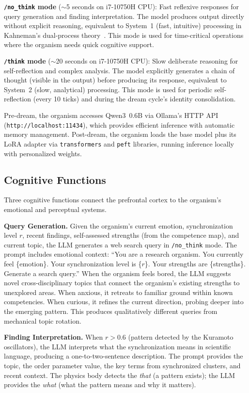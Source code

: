 \documentclass[11pt,a4paper,twocolumn]{article}
\begin{document}
\textbf{\texttt{/no\_think} mode} ($\sim$5 seconds on i7-10750H CPU): Fast reflexive responses for query generation and finding interpretation.
The model produces output directly without explicit reasoning, equivalent to System~1 (fast, intuitive) processing in Kahneman's dual-process theory~\cite{kahneman2011}.
This mode is used for time-critical operations where the organism needs quick cognitive support.

\textbf{\texttt{/think} mode} ($\sim$20 seconds on i7-10750H CPU): Slow deliberate reasoning for self-reflection and complex analysis.
The model explicitly generates a chain of thought (visible in the output) before producing its response, equivalent to System~2 (slow, analytical) processing.
This mode is used for periodic self-reflection (every 10 ticks) and during the dream cycle's identity consolidation.

Pre-dream, the organism accesses Qwen3~0.6B via Ollama's HTTP API (\texttt{http://localhost:11434}), which provides efficient inference with automatic memory management.
Post-dream, the organism loads the base model plus its LoRA adapter via \texttt{transformers} and \texttt{peft} libraries, running inference locally with personalized weights.

\subsection{Cognitive Functions}

Three cognitive functions connect the prefrontal cortex to the organism's emotional and perceptual systems.

\textbf{Query Generation.}
Given the organism's current emotion, synchronization level $r$, recent findings, self-assessed strengths (from the competence map), and current topic, the LLM generates a web search query in \texttt{/no\_think} mode.
The prompt includes emotional context: ``You are a research organism.
You currently feel \{emotion\}.
Your synchronization level is \{$r$\}.
Your strengths are \{strengths\}.
Generate a search query.''
When the organism feels bored, the LLM suggests novel cross-disciplinary topics that connect the organism's existing strengths to unexplored areas.
When anxious, it retreats to familiar ground within known competencies.
When curious, it refines the current direction, probing deeper into the emerging pattern.
This produces qualitatively different queries from mechanical topic rotation.

\textbf{Finding Interpretation.}
When $r > 0.6$ (pattern detected by the Kuramoto oscillators), the LLM interprets what the synchronization means in scientific language, producing a one-to-two-sentence description.
The prompt provides the topic, the order parameter value, the key terms from synchronized clusters, and recent context.
The physics body detects the \emph{that} (a pattern exists); the LLM provides the \emph{what} (what the pattern means and why it matters).
\end{document}
